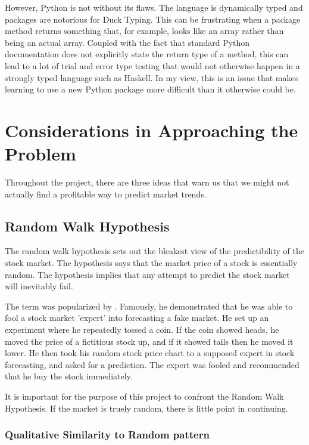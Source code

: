 \documentclass{report}
\begin{document}
However, Python is not without its flaws. The language is dynamically typed and packages are notorious for Duck Typing. This can be frustrating when a package method returns something that, for example, looks like an array rather than being an actual array. Coupled with the fact that standard Python documentation does not explicitly state the return type of a method, this can lead to a lot of trial and error type testing that would not otherwise happen in a strongly typed language such as Haskell. In my view, this is an issue that makes learning to use a new Python package more difficult than it otherwise could be.

\chapter{Considerations in Approaching the Problem}

Throughout the project, there are three ideas that warn us that we might not actually find a profitable way to predict market trends.

\section{Random Walk Hypothesis}

The random walk hypothesis sets out the bleakest view of the predictibility of the stock market. The hypothesis says that the market price of a stock is essentially random. The hypothesis implies that any attempt to predict the stock market will inevitably fail. 

The term was popularized by \citet{malkiel1999random}. Famously, he demonstrated that he was able to fool a stock market 'expert' into forecasting a fake market. He set up an experiment where he repeatedly tossed a coin. If the coin showed heads, he moved the price of a fictitious stock up, and if it showed tails then he moved it lower. He then took his random stock price chart to a supposed expert in stock forecasting, and asked for a prediction. The expert was fooled and recommended that he buy the stock immediately. 

It is important for the purpose of this project to confront the Random Walk Hypothesis. If the market is truely random, there is little point in continuing. 

\subsection{Qualitative Similarity to Random pattern}
\end{document}
